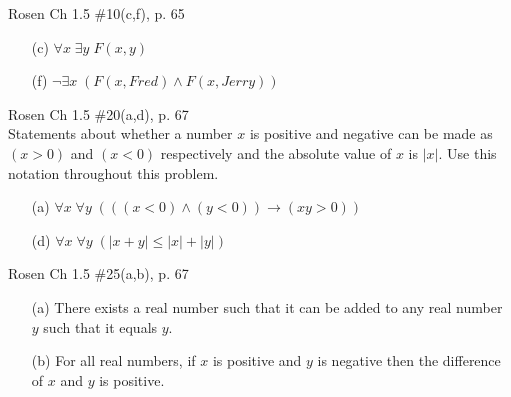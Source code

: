 \documentclass[12pt,addpoints]{exam}
\newcommand{\ra}{\rightarrow}
\begin{document}
\begin{questions}
\question Rosen Ch 1.5 \#10(c,f), p. 65
    \ifprintanswers
        \vspace{-12pt}
    \fi
\begin{solution}
    \begin{itemize}[itemsep=0pt,parsep=0pt,topsep=0pt,partopsep=0pt]
        \item[(c)] $\forall x\; \exists y\; F(x,y)$
        \item[(f)] $\neg \exists x\; (F(x, Fred) \wedge F(x,Jerry))$
    \end{itemize}
\end{solution}


\question Rosen Ch 1.5 \#20(a,d), p. 67 \\
Statements about whether a number $x$ is positive and negative can be made as $(x > 0)$ and $(x < 0)$ respectively and the absolute value of $x$ is $|x|$.  Use this notation throughout this problem.
    \ifprintanswers
        \vspace{-12pt}
    \fi
\begin{solution}
    \begin{itemize}[itemsep=0pt,parsep=0pt,topsep=0pt,partopsep=0pt]
        \item[(a)] $\forall x\; \forall y\; (((x < 0) \wedge (y < 0)) \ra (xy > 0))$
        \item[(d)] $\forall x\; \forall y\; (|x + y| \leq |x| + |y|)$
    \end{itemize}
\end{solution}


\question Rosen Ch 1.5 \#25(a,b), p. 67
    \ifprintanswers
        \vspace{-10pt}
    \fi
\begin{solution}
    \begin{itemize}[itemsep=0pt,parsep=0pt,topsep=0pt,partopsep=0pt]
        \item[(a)] There exists a real number such that it can be added to any real number $y$ such that it equals $y$.
        \item[(b)] For all real numbers, if $x$ is positive and $y$ is negative then the difference of $x$ and $y$ is positive.
    \end{itemize}
\end{solution}



\end{questions}
\end{document}
